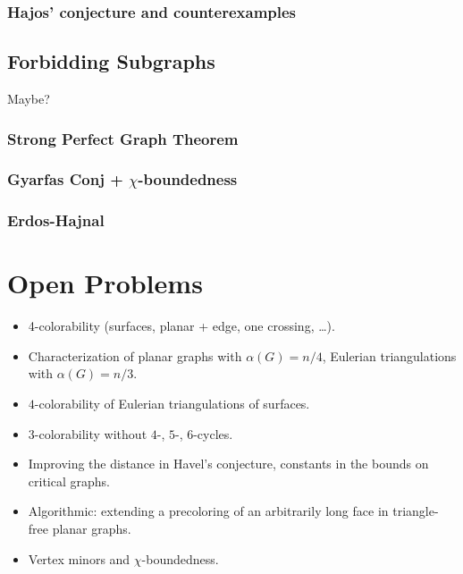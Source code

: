 \documentclass[12pt,twoside,openright,a4paper]{book}
\begin{document}
\section{Hajos' conjecture and counterexamples}

\chapter{Forbidding Subgraphs}

Maybe?

\section{Strong Perfect Graph Theorem}
\section{Gyarfas Conj + $\chi$-boundedness}
\section{Erdos-Hajnal}

\part{Open Problems}

\begin{itemize}
\item 4-colorability (surfaces, planar + edge, one crossing, \ldots).
\item Characterization of planar graphs with $\alpha(G)=n/4$, Eulerian triangulations with $\alpha(G)=n/3$.
\item $4$-colorability of Eulerian triangulations of surfaces.
\item $3$-colorability without $4$-, $5$-, $6$-cycles.
\item Improving the distance in Havel's conjecture, constants in the bounds on critical graphs.
\item Algorithmic: extending a precoloring of an arbitrarily long face in triangle-free planar graphs.
\item Vertex minors and $\chi$-boundedness.
\end{itemize}

\newpage
\pagestyle{plain}
\printindex



\end{document}
